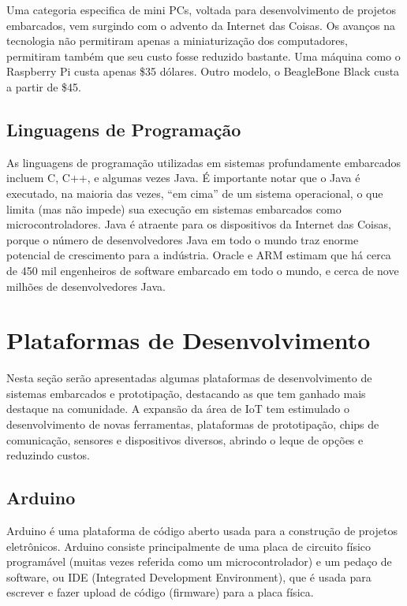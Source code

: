 Uma categoria especifica de mini PCs, voltada para desenvolvimento
de projetos embarcados, vem surgindo com o advento da Internet das
Coisas. Os avanços na tecnologia não permitiram apenas a miniaturização
dos computadores, permitiram também que seu custo fosse reduzido bastante.
Uma máquina como o Raspberry Pi custa apenas \$35 dólares. Outro modelo,
o BeagleBone Black custa a partir de \$45.


\subsection{Linguagens de Programação}

As linguagens de programação utilizadas em sistemas profundamente
embarcados incluem C, C++, e algumas vezes Java. É importante notar
que o Java é executado, na maioria das vezes, ``em cima'' de um
sistema operacional, o que limita (mas não impede) sua execução em
sistemas embarcados como microcontroladores. Java é atraente para
os dispositivos da Internet das Coisas, porque o número de desenvolvedores
Java em todo o mundo traz enorme potencial de crescimento para a indústria.
Oracle e ARM estimam que há cerca de 450 mil engenheiros de software
embarcado em todo o mundo, e cerca de nove milhões de desenvolvedores
Java\cite{java.com:2016}.

\section{Plataformas de Desenvolvimento\label{sec:Plataformas-de-Desenvolvimento}}

Nesta seção serão apresentadas algumas plataformas de desenvolvimento
de sistemas embarcados e prototipação, destacando as que tem ganhado
mais destaque na comunidade. A expansão da área de IoT tem estimulado
o desenvolvimento de novas ferramentas, plataformas de prototipação,
chips de comunicação, sensores e dispositivos diversos, abrindo o
leque de opções e reduzindo custos.

\subsection{Arduino}

Arduino\cite{url:arduino:intro} é uma plataforma de código aberto
usada para a construção de projetos eletrônicos. Arduino consiste
principalmente de uma placa de circuito físico programável (muitas
vezes referida como um microcontrolador) e um pedaço de software,
ou IDE (Integrated Development Environment), que é usada para escrever
e fazer upload de código (firmware) para a placa física\cite{url:arduino:intro}.

